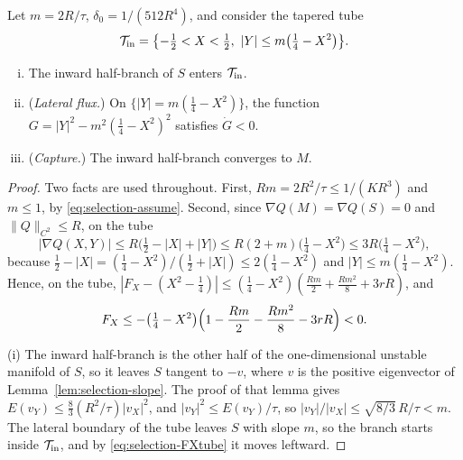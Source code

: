 \begin{lemma}\label{lem:selection-capture}
Let $m=2R/\tau$, $\delta_0=1/(512R^4)$, and consider the tapered tube
\[
\mathcal T_{\rm in}=\bigl\{-\tfrac12<X<\tfrac12,\ |Y|\le m\bigl(\tfrac14-X^2\bigr)\bigr\}.
\]
\begin{enumerate}[(i)]
\item The inward half-branch of $S$ enters $\mathcal T_{\rm in}$.
\item (\emph{Lateral flux.}) On $\{|Y|=m(\frac14-X^2)\}$, the function $G=|Y|^2-m^2(\frac14-X^2)^2$ satisfies $\dot G<0$.
\item (\emph{Capture.}) The inward half-branch converges to $M$.
\end{enumerate}
\end{lemma}

\begin{proof}
Two facts are used throughout. First, $Rm=2R^2/\tau\le1/(KR^3)$ and $m\le1$, by \eqref{eq:selection-assume}. Second, since $\nabla Q(M)=\nabla Q(S)=0$ and $\|Q\|_{C^2}\le R$, on the tube
\begin{equation}\label{eq:selection-Qtube}
|\nabla Q(X,Y)|\le R\bigl(\tfrac12-|X|+|Y|\bigr)\le R(2+m)\bigl(\tfrac14-X^2\bigr)\le3R\bigl(\tfrac14-X^2\bigr),
\end{equation}
because $\frac12-|X|=(\frac14-X^2)/(\frac12+|X|)\le2(\frac14-X^2)$ and $|Y|\le m(\frac14-X^2)$. Hence, on the tube, $|F_X-(X^2-\frac14)|\le(\frac14-X^2)(\frac{Rm}2+\frac{Rm^2}8+3rR)$, and
\begin{equation}\label{eq:selection-FXtube}
F_X\le-\bigl(\tfrac14-X^2\bigr)\Bigl(1-\frac{Rm}2-\frac{Rm^2}8-3rR\Bigr)<0 .
\end{equation}

(i) The inward half-branch is the other half of the one-dimensional unstable manifold of $S$, so it leaves $S$ tangent to $-v$, where $v$ is the positive eigenvector of Lemma~\ref{lem:selection-slope}. The proof of that lemma gives $E(v_Y)\le\frac83(R^2/\tau)|v_X|^2$, and $|v_Y|^2\le E(v_Y)/\tau$, so $|v_Y|/|v_X|\le\sqrt{8/3}\,R/\tau<m$. The lateral boundary of the tube leaves $S$ with slope $m$, so the branch starts inside $\mathcal T_{\rm in}$, and by \eqref{eq:selection-FXtube} it moves leftward.


\end{proof}

